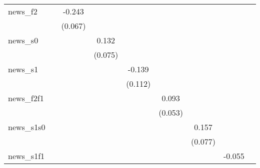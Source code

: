 {\begin{tabular}{l*{8}{c}}
news\_f2     &                     &      -0.243\sym{***}&                     &                     &                     &                     &                     &                     \\
            &                     &     (0.067)         &                     &                     &                     &                     &                     &                     \\
\addlinespace
news\_s0     &                     &                     &       0.132\sym{*}  &                     &                     &                     &                     &                     \\
            &                     &                     &     (0.075)         &                     &                     &                     &                     &                     \\
\addlinespace
news\_s1     &                     &                     &                     &      -0.139         &                     &                     &                     &                     \\
            &                     &                     &                     &     (0.112)         &                     &                     &                     &                     \\
\addlinespace
news\_f2f1   &                     &                     &                     &                     &       0.093\sym{*}  &                     &                     &                     \\
            &                     &                     &                     &                     &     (0.053)         &                     &                     &                     \\
\addlinespace
news\_s1s0   &                     &                     &                     &                     &                     &       0.157\sym{*}  &                     &                     \\
            &                     &                     &                     &                     &                     &     (0.077)         &                     &                     \\
\addlinespace
news\_s1f1   &                     &                     &                     &                     &                     &                     &      -0.055         &                     \\

\end{tabular}}
